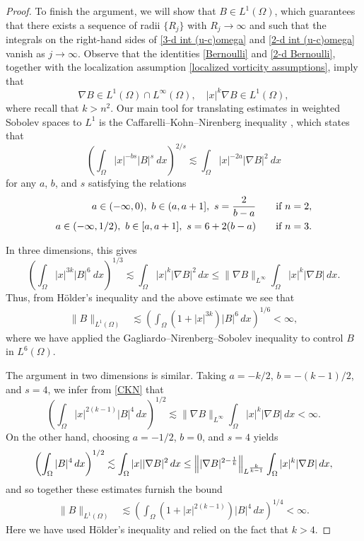 \documentclass[11pt,reqno]{amsart}
\theoremstyle{plain}
\theoremstyle{remark}
\numberwithin{equation}{section}
\begin{document}
\begin{proof}
To finish the argument, we will show that $B \in L^1(\Omega)$, which guarantees that there exists a sequence of radii $\{R_j\}$ with $R_j \to \infty$ and such that the integrals on the right-hand sides of \eqref{3-d int (u-c)omega} and \eqref{2-d int (u-c)omega} vanish as $j \to \infty$.    Observe that the identities \eqref{Bernoulli} and \eqref{2-d Bernoulli}, together with the localization assumption \eqref{localized vorticity assumptions}, imply that 
\[ \nabla B \in L^1(\Omega)\cap L^\infty(\Omega), \quad |x|^k \nabla B \in L^1(\Omega), \]
where recall that $k > n^2$.  Our main tool for translating estimates in weighted Sobolev spaces to $L^1$ is the Caffarelli--Kohn--Nirenberg inequality \cite{caffarelli1984,catrina2001}, which states that
\begin{equation}\label{CKN}
\left( \int_{\Omega} |x|^{-bs}|B|^s\ dx \right)^{2/s} \lesssim \int_{\Omega} |x|^{-2a} |\nabla B|^2 \ dx
\end{equation}
for any $a$, $b$, and $s$ satisfying the relations
\begin{align*}
 a \in (-\infty, 0),~ b \in (a, a+1],~ s = {2\over b-a} &  \qquad \text{if } n = 2, \\
a \in (-\infty, 1/2), ~ b \in [a, a+1], ~ s = {6 + 2(b-a)} & \qquad \text{if } n = 3.
\end{align*}

In three dimensions, this gives
\begin{equation*}
\left( \int_{\Omega} |x|^{3k} |B|^6 \ dx \right)^{1/3} \lesssim \int_{\Omega} |x|^k |\nabla B|^2\, dx \le \|\nabla B\|_{L^\infty}\int_{\Omega} |x|^k |\nabla B|\, dx.
\end{equation*}
Thus, from H\"older's inequality and the above estimate we see that
\begin{align*}
\| B \|_{L^1(\Omega)} & \lesssim \left( \int_{\Omega} (1+|x|^{3k}) |B|^6 \, dx \right)^{1/6} < \infty,
\end{align*}
where we have applied the Gagliardo--Nirenberg--Sobolev inequality to control $B$ in $L^6(\Omega)$.

The argument in two dimensions is similar.  Taking $a = -k/2$, $b = -(k-1)/2$, and $s = 4$, we infer from \eqref{CKN} that
\begin{equation*}
\left( \int_{\Omega} |x|^{2(k-1)} |B|^4 \, dx \right)^{1/2} \lesssim  \|\nabla B\|_{L^\infty}\int_{\Omega} |x|^k |\nabla B|\, dx < \infty.
\end{equation*}
On the other hand, choosing $a = -1/2$, $b = 0$, and $s = 4$ yields
\begin{equation*}
\left( \int_{\Omega} |B|^4 \, dx \right)^{1/2} \lesssim \int_{\Omega} |x| |\nabla B|^2 \,  dx \le  \left\| |\nabla B|^{2 - {1\over k}} \right\|_{L^{{k\over k-1}}}\int_{\Omega} |x|^k |\nabla B|\, dx,
\end{equation*}
and so together these estimates furnish the bound
\begin{align*}
\| B \|_{L^1(\Omega)} & \lesssim \left( \int_{\Omega} \left(1+|x|^{2(k-1)}\right) |B|^4 \, dx \right)^{1/4} < \infty.
\end{align*}
Here we have used H\"older's inequality and relied on the fact that $k > 4$. 
 \end{proof}
 
\end{document}
